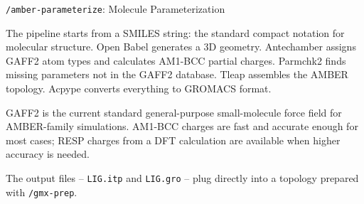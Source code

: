 \documentclass[aspectratio=169, 10pt]{beamer}
\begin{document}
\begin{frame}{\texttt{/amber-parameterize}: Molecule Parameterization}
{  The pipeline starts from a SMILES string: the standard compact notation for molecular structure. Open Babel generates a 3D geometry. Antechamber assigns GAFF2 atom types and calculates AM1-BCC partial charges. Parmchk2 finds missing parameters not in the GAFF2 database. Tleap assembles the AMBER topology. Acpype converts everything to GROMACS format.\par
  GAFF2 is the current standard general-purpose small-molecule force field for AMBER-family simulations. AM1-BCC charges are fast and accurate enough for most cases; RESP charges from a DFT calculation are available when higher accuracy is needed.\par
  The output files -- \texttt{LIG.itp} and \texttt{LIG.gro} -- plug directly into a topology prepared with \texttt{/gmx-prep}.}
\end{frame}
\end{document}
